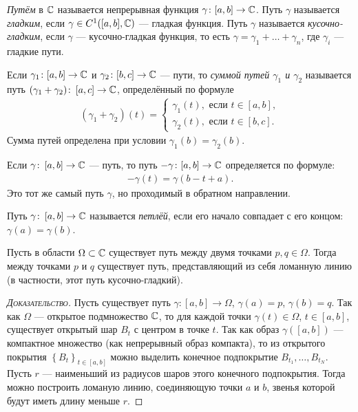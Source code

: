 \documentclass[../complex-analysis.tex]{subfiles}
\begin{document}
\begin{df}[путь]
 \emph{Путём} в $\mathbb{C}$ называется непрерывная функция $\gamma \colon [a,b] \to \mathbb{C}$. Путь $\gamma$ называется \textit{гладким}, если $\gamma \in C^{1}([a,b],\mathbb{C})$ --- гладкая функция. Путь $\gamma$ называется \textit{кусочно-гладким}, если $\gamma$ --- кусочно-гладкая функция, то есть $\gamma = \gamma_1 + \ldots + \gamma_n$, где $\gamma_i$ --- гладкие пути.
\end{df}

\begin{df}
 Если $\gamma_1 \colon [a,b] \to \mathbb{C}$ и $\gamma_2 \colon [b,c] \to \mathbb{C}$ --- пути, то \textit{суммой путей $\gamma_1$ и $\gamma_2$} называется путь $(\gamma_1 + \gamma_2)\colon\, [a,c] \to \mathbb{C}$, определённый по формуле
 \begin{align*}
  (\gamma_1 + \gamma_2)(t) = \begin{cases}
   \gamma_1(t), \text{ если } t \in [a,b],  \\
   \gamma_2(t), \text{ если } t \in [b,c].
  \end{cases} 
 \end{align*} Сумма путей определена при условии $\gamma_1(b) = \gamma_2(b)$.
\end{df}

\begin{notatn}
 Если $\gamma \colon\, [a,b] \to \mathbb{C}$ --- путь, то путь $-\gamma \colon [a,b] \to \mathbb{C}$ определяется по формуле:
 \begin{align*}
  -\gamma(t) = \gamma(b - t + a).
 \end{align*} Это тот же самый путь $ \gamma $, но проходимый в обратном направлении.
\end{notatn}

\begin{df}
 Путь $ \gamma \colon\, [a,b]\to\mathbb{C} $ называется \emph{петлёй}, если его начало совпадает с его концом: $ \gamma(a)=\gamma(b) $.
\end{df}

\begin{prop}
 \label{prop:smooth_path_existance}
 Пусть в области $ \Omega \subset \mathbb{C} $ существует путь между двумя точками $ p, q\in\Omega $. Тогда между точками $ p $ и $ q $ существует путь, представляющий из себя ломанную линию (в частности, этот путь кусочно-гладкий).
\end{prop}
\begin{proof}[\normalfont\textsc{Доказательство}]
 Пусть существует путь $ \gamma\colon[a,b]\to\Omega $, $ \gamma(a) = p $, $ \gamma(b)=q $. Так как $ \Omega $ --- открытое подмножество $ \mathbb{C} $, то для каждой точки $ \gamma(t) \in \Omega $, $ t \in [a,b] $, существует открытый шар $ B_t $ с центром в точке $ t $. Так как образ $ \gamma([a,b]) $ --- компактное множество (как непрерывный образ компакта), то из открытого покрытия $ \left\{B_t\right\}_{t \in [a,b]} $  можно выделить конечное подпокрытие $ B_{t_1}, \ldots, B_{t_N} $. Пусть $ r $ --- наименьший из радиусов шаров этого конечного подпокрытия. Тогда можно построить ломаную линию, соединяющую точки $ a $ и $ b $, звенья которой будут иметь длину меньше $ r $.
\end{proof}
\end{document}
